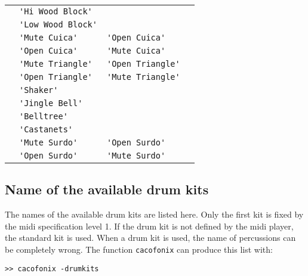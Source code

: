 \documentclass{article}
\newcommand\lvlo{}
\newcommand\lvlt{\ding{105}}
\begin{document}
\begin{center}
\begin{longtable}{llll}
 \lvlo & \lstinline!'Hi Wood Block'! & & \\
 \lvlo & \lstinline!'Low Wood Block'! & & \\
 \lvlo & \lstinline!'Mute Cuica'! & \lstinline!'Open Cuica'! & \\
 \lvlo & \lstinline!'Open Cuica'! & \lstinline!'Mute Cuica'! & \\
 \lvlo & \lstinline!'Mute Triangle'! & \lstinline!'Open Triangle'! & \\
 \lvlo & \lstinline!'Open Triangle'! & \lstinline!'Mute Triangle'! & \\
 \lvlt & \lstinline!'Shaker'! & & \\
 \lvlt & \lstinline!'Jingle Bell'! & & \\
 \lvlt & \lstinline!'Belltree'! & & \\
 \lvlt & \lstinline!'Castanets'! & & \\
 \lvlt & \lstinline!'Mute Surdo'! & \lstinline!'Open Surdo'! & \\
 \lvlt & \lstinline!'Open Surdo'! & \lstinline!'Mute Surdo'! & \\
\end{longtable}
\end{center}

\subsection{Name of the available drum kits}
\label{sec:AvailDrumKits}

The names of the available drum kits are listed here. Only the first kit is fixed by the midi specification level 1. If the drum kit is not defined by the midi player, the standard kit is used. When a drum kit is used, the name of percussions can be completely wrong. The function \lstinline!cacofonix! can produce this list with:
\begin{lstlisting}
>> cacofonix -drumkits
\end{lstlisting}
\end{document}
